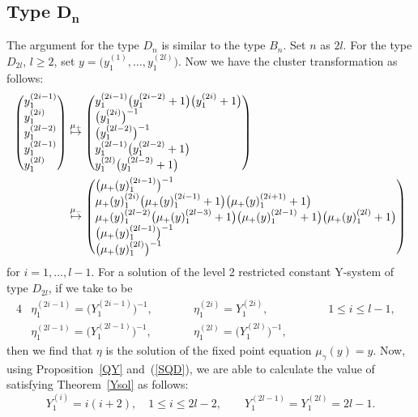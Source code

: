 \documentclass[10pt,a4paper]{amsart}
\numberwithin{equation}{section}
\begin{document}
	\subsection[Type D\_n]{Type $\boldsymbol{D_n}$}
The argument for the type $D_n$ is similar to the type $B_n$.
Set $n$ as $2l$.
For the type $D_{2l}$, $l\geq2$, set $y=\bigl(y_1^{(1)},\dots,y_1^{(2l)}\bigr)$.
Now we have the cluster transformation as follows:
		\begin{align*}
		\left( \begin{array}{@{}l@{}}
			y_1^{(2i-1)}\\
			y_1^{(2i)}\\
			y_1^{(2l-2)}\\
			y_1^{(2l-1)}\\
			y_1^{(2l)}
		\end{array} \right)&\overset{\mu_+}{\mapsto}
		\left( \begin{array}{@{}l@{}}
			y_1^{(2i-1)}\bigl(y_1^{(2i-2)}+1\bigr)\bigl(y_1^{(2i)}+1\bigr)\\
			\bigl(y_1^{(2i)}\bigr)^{-1}\\
			\bigl(y_1^{(2l-2)}\bigr)^{-1}\\
			y_1^{(2l-1)}\bigl(y_1^{(2l-2)}+1\bigr)\\
			y_1^{(2l)}\bigl(y_1^{(2l-2)}+1\bigr)
		\end{array} \right)\\
		&\overset{\mu_-}{\mapsto}
		\left( \begin{array}{@{}l@{}}
			\bigl(\mu_+(y)_1^{(2i-1)}\bigr)^{-1}\\
			\mu_+(y)_1^{(2i)}\bigl(\mu_+(y)_1^{(2i-1)}+1\bigr)\bigl(\mu_+(y)_1^{(2i+1)}+1\bigr)\\
			\mu_+(y)_1^{(2l-2)}\bigl(\mu_+(y)_1^{(2l-3)}+1\bigr)\bigl(\mu_+(y)_1^{(2l-1)}+1\bigr)\bigl(\mu_+(y)_1^{(2l)}+1\bigr)\\
			\bigl(\mu_+(y)_1^{(2l-1)}\bigr)^{-1}\\
			\bigl(\mu_+(y)_1^{(2l)}\bigr)^{-1}
		\end{array} \right)
		\end{align*}
for $i=1,\dots,l-1$.
For a solution of the level 2 restricted constant Y-system of type $D_{2l}$, if we take  to be
	\begin{alignat*}{4}
 &\eta_1^{(2i-1)}=\bigl(Y_1^{(2i-1)}\bigr)^{-1},\qquad&& \eta_1^{(2i)}=Y_1^{(2i)},\qquad&& 1\leq i\leq l-1, & \\ &\eta_1^{(2l-1)}=\bigl(Y_1^{(2l-1)}\bigr)^{-1},\qquad&&\eta_1^{(2l)}=\bigl(Y_1^{(2l)}\bigr)^{-1},\qquad&& &
 \end{alignat*}
then we find that $\eta$ is the solution of the fixed point equation $\mu_\gamma(y)=y$.
Now, using Proposition~\ref{QY} and~(\ref{SQD}), we are able to calculate the value of  satisfying Theorem~\ref{Ysol} as follows:
	\[Y_1^{(i)}=i(i+2),\quad 1\leq i\leq 2l-2,\qquad Y_1^{(2l-1)}=Y_1^{(2l)}=2l-1.\]
\end{document}
